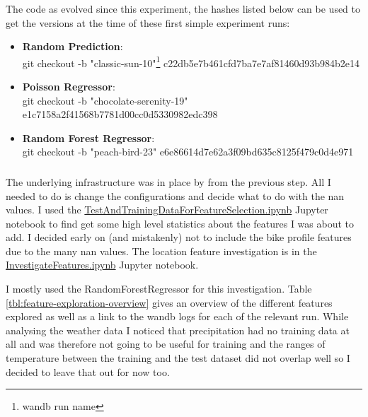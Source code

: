 \documentclass[a4paper]{article}
\begin{document}
    The code as evolved since this experiment, the hashes listed below can be used to get the versions at the time of
    these first simple experiment runs:

    \begin{itemize}
        \item \textbf{Random Prediction}: \\git checkout -b "classic-sun-10"\footnote{\label{fn:wand-db-name}wandb run name} c22db5e7b461cfd7ba7e7af81460d93b984b2e14
        \item \textbf{Poisson Regressor}: \\git checkout -b "chocolate-serenity-19" e1c7158a2f41568b7781d00cc0d5330982edc398
        \item \textbf{Random Forest Regressor}: \\git checkout -b "peach-bird-23" e6e86614d7e62a3f09bd635c8125f479c0d4e971
    \end{itemize}

    \subsubsection*{}
    The underlying infrastructure was in place by from the previous step. All I needed to do is change the configurations
    and decide what to do with the nan values. I used the
    \href{https://github.com/isabelladegen/mlp-2021/blob/c48d85dc364b5a2e7e59f16961b32f9e6c245735/notebooks/TestAndTrainingDataForFeatureSelection.ipynb}{TestAndTrainingDataForFeatureSelection.ipynb}
    Jupyter notebook to find get some high level statistics about the features I was about to add. I decided early
    on (and mistakenly) not to include the bike profile features due to the many nan values. The location feature investigation is
    in the \href{https://github.com/isabelladegen/mlp-2021/blob/c48d85dc364b5a2e7e59f16961b32f9e6c245735/notebooks/InvestigateFeatures.ipynb}{InvestigateFeatures.ipynb}
    Jupyter notebook.

    I mostly used the RandomForestRegressor for this investigation. Table \ref{tbl:feature-exploration-overview} gives an
    overview of the different
    features explored as well as a link to the wandb logs for each of the relevant run. While analysing the
    weather data I noticed that precipitation had no training data at all and was therefore not going to be useful for training and
    the ranges of temperature between the training and the test dataset did not overlap well so I decided to leave that out
    for now too.
\end{document}
